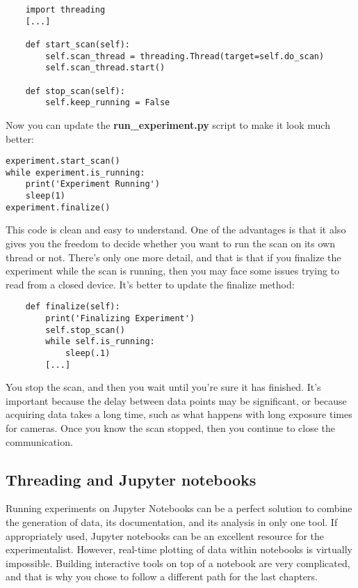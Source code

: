 \begin{verbatim}
    import threading
    [...]

    def start_scan(self):
        self.scan_thread = threading.Thread(target=self.do_scan)
        self.scan_thread.start()

    def stop_scan(self):
        self.keep_running = False
\end{verbatim}

Now you can update the \textbf{run\_experiment.py} script to make it look much better:

\begin{verbatim}
experiment.start_scan()
while experiment.is_running:
    print('Experiment Running')
    sleep(1)
experiment.finalize()
\end{verbatim}

This code is clean and easy to understand. One of the advantages is that it also gives you the freedom to decide whether you want to run the scan on its own thread or not. There's only one more detail, and that is that if you finalize the experiment while the scan is running, then you may face some issues trying to read from a closed device. It's better to update the finalize method:

\begin{verbatim}
    def finalize(self):
        print('Finalizing Experiment')
        self.stop_scan()
        while self.is_running:
            sleep(.1)
        [...]
\end{verbatim}

You stop the scan, and then you wait until you're sure it has finished. It's important because the delay between data points may be significant, or because acquiring data takes a long time, such as what happens with long exposure times for cameras. Once you know the scan stopped, then you continue to close the communication.

\subsection{Threading and Jupyter notebooks}\label{subsec:jupyter}
Running experiments on Jupyter Notebooks can be a perfect solution to combine the generation of data, its documentation, and its analysis in only one tool. If appropriately used, Jupyter notebooks can be an excellent resource for the experimentalist. However, real-time plotting of data within notebooks is virtually impossible. Building interactive tools on top of a notebook are very complicated, and that is why you chose to follow a different path for the last chapters.

